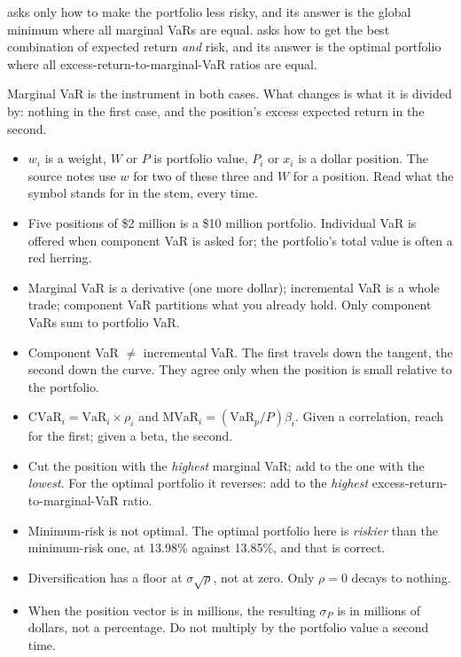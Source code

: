 \begin{imdefbox}[title={The difference in one line}]
 asks only how to make the portfolio less risky, and its
answer is the global minimum where all marginal VaRs are equal.
 asks how to get the best combination of expected
return \emph{and} risk, and its answer is the optimal portfolio where all
excess-return-to-marginal-VaR ratios are equal.
\end{imdefbox}

Marginal VaR is the instrument in both cases. What changes is what it is divided
by: nothing in the first case, and the position's excess expected return in the
second.

\begin{imtrapbox}[title={Consolidated trap summary --- IM-5}]
\begin{itemize}
\item {} $w_i$ is a weight, $W$ or $P$ is portfolio value, $P_i$ or
$x_i$ is a dollar position. The source notes use $w$ for two of these three and
$W$ for a position. Read what the symbol stands for in the stem, every time.
\item {} Five positions of \$2 million is a \$10
million portfolio. Individual VaR is offered when component VaR is asked for; the
portfolio's total value is often a red herring.
\item {} Marginal VaR is a derivative (one more dollar);
incremental VaR is a whole trade; component VaR partitions what you already hold.
Only component VaRs sum to portfolio VaR.
\item {} Component VaR $\ne$ incremental VaR. The
first travels down the tangent, the second down the curve. They agree only when
the position is small relative to the portfolio.
\item {} $\text{CVaR}_i = \text{VaR}_i \times \rho_i$ and
$\text{MVaR}_i = (\text{VaR}_p/P)\beta_i$. Given a correlation, reach for the
first; given a beta, the second.
\item {} Cut the position with the \emph{highest} marginal
VaR; add to the one with the \emph{lowest}. For the optimal portfolio it reverses:
add to the \emph{highest} excess-return-to-marginal-VaR ratio.
\item {} Minimum-risk is not optimal. The optimal portfolio
here is \emph{riskier} than the minimum-risk one, at 13.98\% against 13.85\%, and
that is correct.
\item {} Diversification has a floor at
$\sigma\sqrt{\rho}$, not at zero. Only $\rho = 0$ decays to nothing.
\item {} When the position vector is in millions, the resulting
$\sigma_P$ is in millions of dollars, not a percentage. Do not multiply by the
portfolio value a second time.
\end{itemize}
\end{imtrapbox}

